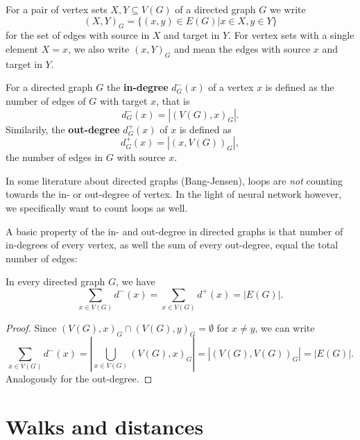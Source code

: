 \begin{remark} 
   For a pair of vertex sets $X,Y
  \subseteq V(G)$ of a directed graph $G$ we write
  \[
  (X,Y)_G = \{(x,y) \in E(G) | x \in X, y \in Y \}
  \]
  for the set of edges with source in $X$ and target in $Y$. For
  vertex sets with a single element $X = {x}$, we also write $(x,Y)_G$
  and mean the edges with source $x$ and target in $Y$.
\end{remark}


\begin{definition}  
  For a directed graph $G$ the \textbf{in-degree} $d^-_G(x)$ of a
  vertex $x$ is defined as the number of edges of $G$ with target $x$,
  that is
  \[
  d^-_G(x) = \left|(V(G),x)_G\right|.
  \]
  Similarily, the \textbf{out-degree} $d^+_G(x)$ of $x$ is defined as
  \[
  d^+_G(x) = \left|(x, V(G))_G\right|,
  \]
  the number of edges in $G$ with source $x$.
\end{definition}

\begin{remark}[Side]
  In some literature about directed graphs (Bang-Jensen), loops are
  \textit{not} counting towards the in- or out-degree of vertex. In
  the light of neural network however, we specifically want to count
  loops as well.
\end{remark}

A basic property of the in- and out-degree in directed graphs is that
number of in-degrees of every vertex, as well the sum of every
out-degree, equal the total number of edges:

\begin{proposition}
  In every directed graph $G$, we have
  \[
  \sum_{x \in V(G)} d^-(x) = \sum_{x \in V(G)} d^+(x) = | E(G) |.
  \]
\end{proposition}

\begin{proof}
  Since $(V(G),x)_G \cap (V(G),y)_G = \emptyset$ for $x \ne y$, we can
  write
  \[
  \sum_{x \in V(G)} d^-(x) = \left| \bigcup_{x \in V(G)} (V(G),x)_G
  \right| = \left| (V(G),V(G))_G \right| = | E(G) |.
  \]
  Analogously for the out-degree.
\end{proof}


\section{Walks and distances}

